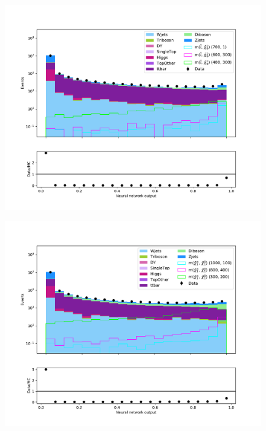 \begin{figure}[H]
    \centering
        \includegraphics[width = \textwidth]{Figures/Stacked/stackedplot_NN_High_level_slepslep.pdf}
        \caption{}
        \label{fig:traintestscaled}
\end{figure}





\begin{figure}[H]
    \centering
        \includegraphics[width = \textwidth]{Figures/Stacked/stackedplot_NN_All_level_slepsnu.pdf}
        \caption{}
        \label{fig:traintestscaled}
\end{figure}

